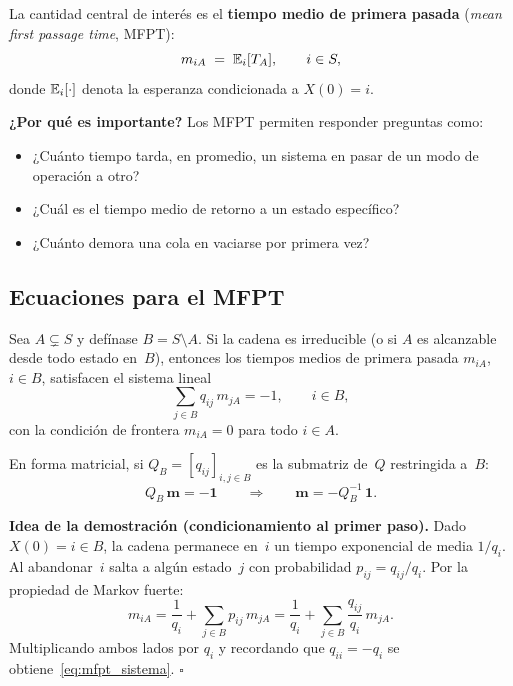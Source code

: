 \documentclass[11pt, letterpaper]{article}
\begin{document}
La cantidad central de interés es el \textbf{tiempo medio de primera
pasada} (\emph{mean first passage time}, MFPT):
\[
  m_{iA} \;=\; \mathbb{E}_i[T_A], \qquad i\in S,
\]
donde $\mathbb{E}_i[\cdot]$ denota la esperanza condicionada a $X(0)=i$.

\medskip
\textbf{¿Por qué es importante?}  Los MFPT permiten responder
preguntas como:
\begin{itemize}
  \item ¿Cuánto tiempo tarda, en promedio, un sistema en pasar de un
        modo de operación a otro?
  \item ¿Cuál es el tiempo medio de retorno a un estado específico?
  \item ¿Cuánto demora una cola en vaciarse por primera vez?
\end{itemize}

\subsection{Ecuaciones para el MFPT}

\begin{metodobox}
  Sea $A\subsetneq S$ y defínase $B = S\setminus A$.  Si la cadena
  es irreducible (o si $A$ es alcanzable desde todo estado en~$B$),
  entonces los tiempos medios de primera pasada $m_{iA}$, $i\in B$,
  satisfacen el sistema lineal
  \begin{equation}\label{eq:mfpt_sistema}
    \sum_{j\in B} q_{ij}\,m_{jA} = -1, \qquad i \in B,
  \end{equation}
  con la condición de frontera $m_{iA}=0$ para todo $i\in A$.

  \medskip
  En forma matricial, si $Q_B = [q_{ij}]_{i,j\in B}$ es la
  submatriz de~$Q$ restringida a~$B$:
  \begin{equation}\label{eq:mfpt_matricial}
    Q_B\,\mathbf{m} = -\mathbf{1}
    \qquad\Longrightarrow\qquad
    \mathbf{m} = -Q_B^{-1}\,\mathbf{1}.
  \end{equation}
\end{metodobox}

\textbf{Idea de la demostración (condicionamiento al primer paso).}
Dado $X(0)=i\in B$, la cadena permanece en~$i$ un tiempo exponencial
de media $1/q_i$.  Al abandonar~$i$ salta a algún estado~$j$ con
probabilidad $p_{ij}=q_{ij}/q_i$.  Por la propiedad de Markov
fuerte:
\[
  m_{iA} = \frac{1}{q_i} + \sum_{j\in B} p_{ij}\,m_{jA}
         = \frac{1}{q_i} + \sum_{j\in B} \frac{q_{ij}}{q_i}\,m_{jA}.
\]
Multiplicando ambos lados por $q_i$ y recordando que $q_{ii}=-q_i$
se obtiene~\eqref{eq:mfpt_sistema}. $\square$
\end{document}
